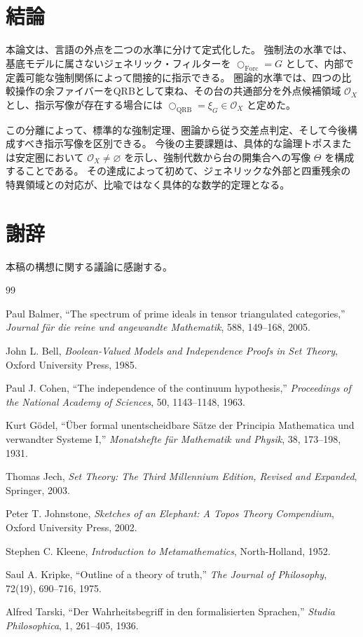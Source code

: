 \documentclass[11pt]{ltjsarticle}
\theoremstyle{plain}
\theoremstyle{definition}
\newcommand{\dfix}{\bigcirc}
\begin{document}
\section{結論}
\label{sec:conclusion}

本論文は、言語の外点を二つの水準に分けて定式化した。
強制法の水準では、基底モデルに属さないジェネリック・フィルターを \(\dfix_{\mathrm{Forc}}=G\) として、内部で定義可能な強制関係によって間接的に指示できる。
圏論的水準では、四つの比較操作の余ファイバーをQRBとして束ね、その台の共通部分を外点候補領域 \(\mathcal O_X\) とし、指示写像が存在する場合には \(\dfix_{\mathrm{QRB}}=\xi_G\in\mathcal O_X\) と定めた。

この分離によって、標準的な強制定理、圏論から従う交差点判定、そして今後構成すべき指示写像を区別できる。
今後の主要課題は、具体的な論理トポスまたは安定圏において \(\mathcal O_X\neq\varnothing\) を示し、強制代数から台の開集合への写像 \(\Theta\) を構成することである。
その達成によって初めて、ジェネリックな外部と四重残余の特異領域との対応が、比喩ではなく具体的な数学的定理となる。

\section*{謝辞}
本稿の構想に関する議論に感謝する。

\begin{thebibliography}{99}

Paul Balmer,
``The spectrum of prime ideals in tensor triangulated categories,''
\emph{Journal für die reine und angewandte Mathematik}, 588, 149--168, 2005.

John L. Bell,
\emph{Boolean-Valued Models and Independence Proofs in Set Theory},
Oxford University Press, 1985.

Paul J. Cohen,
``The independence of the continuum hypothesis,''
\emph{Proceedings of the National Academy of Sciences}, 50, 1143--1148, 1963.

Kurt Gödel,
``Über formal unentscheidbare Sätze der Principia Mathematica und verwandter Systeme I,''
\emph{Monatshefte für Mathematik und Physik}, 38, 173--198, 1931.

Thomas Jech,
\emph{Set Theory: The Third Millennium Edition, Revised and Expanded},
Springer, 2003.

Peter T. Johnstone,
\emph{Sketches of an Elephant: A Topos Theory Compendium},
Oxford University Press, 2002.

Stephen C. Kleene,
\emph{Introduction to Metamathematics},
North-Holland, 1952.

Saul A. Kripke,
``Outline of a theory of truth,''
\emph{The Journal of Philosophy}, 72(19), 690--716, 1975.

Alfred Tarski,
``Der Wahrheitsbegriff in den formalisierten Sprachen,''
\emph{Studia Philosophica}, 1, 261--405, 1936.

\end{thebibliography}
\end{document}
